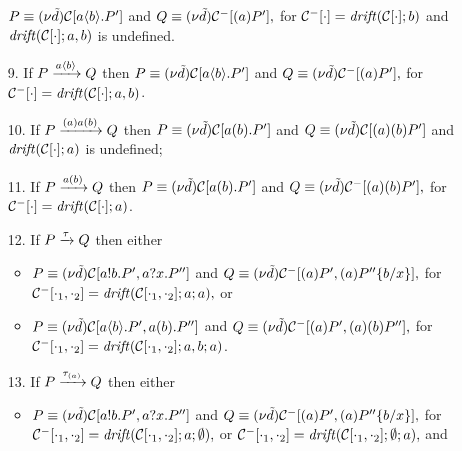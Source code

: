 \begin{lemma}{\label{lemm:inv_on_lts}}
\begin{itemize}
$P\equiv(\nu \tilde {d})\mathcal{C}[a\langle b\rangle.P']$ and  
$Q\equiv(\nu \tilde {d})\mathcal{C}^-[(a)P'],$ for $\mathcal{C}^-[\cdot]=\mathit {drift}(\mathcal{C}[\cdot]; b)$ and $\mathit {drift}(\mathcal{C}[\cdot]; a,b)$ is undefined.
\item[9.]  If $P\xrightarrow{a\langle b\rangle}Q$ then 
$P\equiv(\nu \tilde {d})\mathcal{C}[a\langle b\rangle.P']$ and  
$Q\equiv(\nu \tilde {d})\mathcal{C}^-[(a)P'],$ for $\mathcal{C}^-[\cdot]=\mathit {drift}(\mathcal{C}[\cdot]; a,b)$.
\item[10.] If $P\xrightarrow{{(a)}a(b)}Q$ then 
$P\equiv(\nu \tilde {d})\mathcal{C}[a(b).P']$ and 
$Q\equiv(\nu \tilde {d})\mathcal{C}[(a)(b)P']$ and \\
$\mathit {drift}(\mathcal{C}[\cdot]; a)$ is undefined;
\item[11.] If $P\xrightarrow{a(b)}Q$ then 
$P\equiv(\nu \tilde {d})\mathcal{C}[a(b).P']$ and 
$Q\equiv(\nu \tilde {d})\mathcal{C}^-[(a)(b)P'],$ for $\mathcal{C}^-[\cdot]=\mathit {drift}(\mathcal{C}[\cdot]; a)$.
\item[12.] If $P\xrightarrow{\tau}Q$ then either
	\begin{itemize}
	\item $P\equiv (\nu \tilde {d})\mathcal{C}[a!b.P', a?x.P'']$ and 
	$Q\equiv(\nu \tilde {d})\mathcal{C}^-[(a)P', (a)P''\{b/x\}],$ for $\mathcal{C}^-[\cdot_1,\cdot_2]=\mathit {drift}(\mathcal{C}[\cdot_1, \cdot_2 ]; a;a),$ or 
	\item $P\equiv (\nu \tilde {d})\mathcal{C}[a\langle b\rangle.P', a(b).P'']$ and 
	$Q\equiv (\nu \tilde {d})\mathcal{C}^-[(a)P', (a)(b)P''],$ for\\ 
	$\mathcal{C}^-[\cdot_1,\cdot_2]=\mathit {drift}(\mathcal{C}[\cdot_1, \cdot_2 ]; a,b;a)$.
	\end{itemize}
\item[13.] If $P\xrightarrow{\tau_{(a)}}Q$ then either
	\begin{itemize}
	\item  $P\equiv (\nu \tilde {d})\mathcal{C}[a!b.P', a?x.P'']$ and $Q\equiv(\nu \tilde {d})\mathcal{C}^-[(a)P', (a)P''\{b/x\}],$ for 
	$\mathcal{C}^-[\cdot_1,\cdot_2]=\mathit {drift}(\mathcal{C}[\cdot_1, \cdot_2 ];  a; \emptyset),$ or $\mathcal{C}^-[\cdot_1,\cdot_2]=\mathit {drift}(\mathcal{C}[\cdot_1, \cdot_2 ]; \emptyset; a),$ and 

\end{itemize}
\end{itemize}
\end{lemma}
